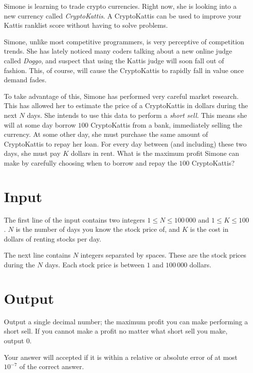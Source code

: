 Simone is learning to trade crypto currencies.
Right now, she is looking into a new currency called \emph{CryptoKattis}.
A CryptoKattis can be used to improve your Kattis ranklist score without having to solve problems.

Simone, unlike most competitive programmers, is very perceptive of competition trends.
She has lately noticed many coders talking about a new online judge called \emph{Doggo}, and suspect that using the Kattis judge will soon fall out of fashion.
This, of course, will cause the CryptoKattis to rapidly fall in value once demand fades.

To take advantage of this, Simone has performed very careful market research.
This has allowed her to estimate the price of a CryptoKattis in dollars during the next $N$ days.
She intends to use this data to perform a \emph{short sell}.
This means she will at some day borrow $100$ CryptoKattis from a bank, immediately selling the currency.
At some other day, she must purchase the same amount of CryptoKattis to repay her loan.
For every day between (and including) these two days, she must pay $K$ dollars in rent.
What is the maximum profit Simone can make by carefully choosing when to borrow and repay the $100$ CryptoKattis?

\section*{Input}
The first line of the input contains two integers $1 \le N \le 100\,000$ and $1 \le K \le 100$.
$N$ is the number of days you know the stock price of, and $K$ is the cost in dollars of renting stocks per day.

The next line contains $N$ integers separated by spaces.
These are the stock prices during the $N$ days.
Each stock price is between $1$ and $100\,000$ dollars.

\section*{Output}
Output a single decimal number; the maximum profit you can make performing a short sell.
If you cannot make a profit no matter what short sell you make, output $0$.

Your answer will accepted if it is within a relative or absolute error of at most $10^{-7}$ of the correct answer.
